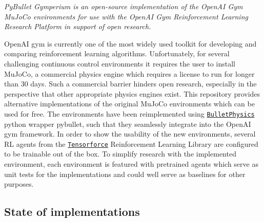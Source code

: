 {\itshape Py\+Bullet Gymperium is an open-\/source implementation of the Open\+AI Gym Mu\+Jo\+Co environments for use with the Open\+AI Gym Reinforcement Learning Research Platform in support of open research.}

Open\+AI gym is currently one of the most widely used toolkit for developing and comparing reinforcement learning algorithms. Unfortunately, for several challenging continuous control environments it requires the user to install Mu\+Jo\+Co, a commercial physics engine which requires a license to run for longer than 30 days. Such a commercial barrier hinders open research, especially in the perspective that other appropriate physics engines exist. This repository provides alternative implementations of the original Mu\+Jo\+Co environments which can be used for free. The environments have been reimplemented using \href{https://github.com/bulletphysics/bullet3}{\tt Bullet\+Physics\textquotesingle{}} python wrapper pybullet, such that they seamlessly integrate into the Open\+AI gym framework. In order to show the usability of the new environments, several RL agents from the \href{https://github.com/reinforceio/tensorforce}{\tt Tensorforce} Reinforcement Learning Library are configured to be trainable out of the box. To simplify research with the implemented environment, each environment is featured with pretrained agents which serve as unit tests for the implementations and could well serve as baselines for other purposes.

\subsection*{State of implementations}

